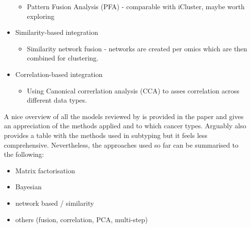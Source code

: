 \begin{itemize}
        \begin{itemize}
            \item Pattern Fusion Analysis (PFA) - comparable with iCluster, maybe worth exploring
        \end{itemize}
    \item Similarity-based integration
        \begin{itemize}
            \item Similarity network fusion - networks are created per omics which are then combined for clustering.
        \end{itemize}
    \item Correlation-based integration
        \begin{itemize}
            \item Using Canonical correrlation analysis (CCA) to asses correlation across different data types.
        \end{itemize}
\end{itemize}

A nice overview of all the models reviewed by \citet{Menyhart2021-ef} is provided in the paper and gives an appreciation of the methods applied and to which cancer types. Arguably \citet{Subramanian2020-tk} also provides a table with the methods used in subtyping but it feels less comprehensive. Nevertheless, the approaches used so far can be summarised to the following:
\begin{itemize}
    \item Matrix factorisation
    \item Bayesian
    \item network based / similarity 
    \item others (fusion, correlation, PCA, multi-step)
\end{itemize}


